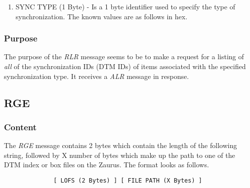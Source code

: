             \begin{enumerate}
            \item SYNC TYPE (1 Byte) - Is a 1 byte identifier used to specify
              the type of synchronization. The known values are as 
              follows in hex.

              \synctypes
            \end{enumerate}
            
            \subsubsection{Purpose}

            The purpose of the \emph{RLR} message seems to be to make a
            request for a listing of \emph{all} of the synchronization IDs
            (DTM IDs) of items associated with the specified synchronization
            type. It receives a \emph{ALR} message in response.

        \subsection{RGE}

            \subsubsection{Content}

            The \emph{RGE} message contains 2 bytes which contain the length
            of the following string, followed by X number of bytes which make
            up the path to one of the DTM index or box files on the
            Zaurus. The format looks as follows.

            \begin{verbatim}
              [ LOFS (2 Bytes) ] [ FILE PATH (X Bytes) ]
            \end{verbatim}


